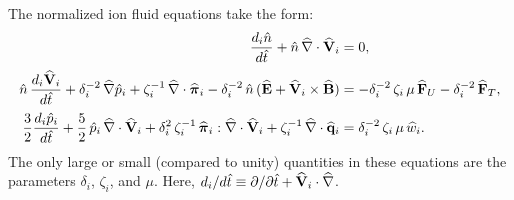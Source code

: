 \documentclass[notitlepage,12pt]{article}
\newcommand{\bpi}{\mbox{\boldmath$\pi$}}
\begin{document}
The normalized ion fluid equations take the form:
\begin{align}\label{e3.116a}
\frac{d_i \hat{n}}{d\hat{t}} + \hat{n}\,\widehat{\nabla}\cdot\widehat{\bf V}_i &=0,\\[0.5ex]
\hat{n}\,\frac{d_i \widehat{\bf V}_i}{d\hat{t}} +
\delta_i^{-2}\,\widehat{\nabla}\hat{p}_i+\zeta_i^{-1}\,\widehat{\nabla}
\cdot\widehat{\bpi}_i  
-\delta_i^{-2}\,\hat{n}\,(\widehat{\bf E} + \widehat{\bf V}_i
\times\widehat{\bf B}) &=-\delta_i^{-2}\,\zeta_i\,\mu\,\widehat{\bf F}_U
 - \delta_i^{-2}\,\widehat{\bf F}_T, \\[0.5ex]
\frac{3}{2}\frac{d_i \hat{p}_i}{d\hat{t}} + \frac{5}{2}\,
\hat{p}_i\,\widehat{\nabla}\cdot\widehat{\bf V}_i + \delta_i^{2}\,
\zeta_i^{-1}\,\widehat{\bpi}_i : \widehat{\nabla}\cdot\widehat{\bf V}_i
+\zeta_i^{-1} \,\widehat{\nabla}\cdot\widehat{\bf q}_{i}
&= \delta_i^{-2}\,\zeta_i\,\mu\,\widehat{w}_i. \label{e3.116c}
\end{align}
The only large or small (compared to unity) quantities in these equations are the
parameters $\delta_i$, $\zeta_i$, and $\mu$. 
Here, $d_i/d\hat{t}\equiv\partial /\partial\hat{t} +
 \widehat{\bf V}_i\cdot\widehat{\nabla}$.
\end{document}
